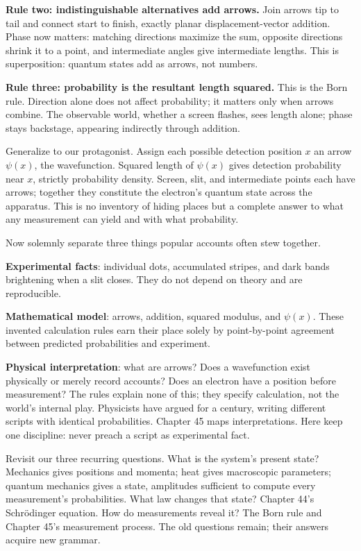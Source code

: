 \textbf{Rule two: indistinguishable alternatives add arrows.} Join arrows tip to tail and connect start to finish, exactly planar displacement-vector addition. Phase now matters: matching directions maximize the sum, opposite directions shrink it to a point, and intermediate angles give intermediate lengths. This is superposition: quantum states add as arrows, not numbers.

\textbf{Rule three: probability is the resultant length squared.} This is the Born rule. Direction alone does not affect probability; it matters only when arrows combine. The observable world, whether a screen flashes, sees length alone; phase stays backstage, appearing indirectly through addition.

Generalize to our protagonist. Assign each possible detection position \(x\) an arrow \(\psi(x)\), the wavefunction. Squared length of \(\psi(x)\) gives detection probability near \(x\), strictly probability density. Screen, slit, and intermediate points each have arrows; together they constitute the electron's quantum state across the apparatus. This is no inventory of hiding places but a complete answer to what any measurement can yield and with what probability.

Now solemnly separate three things popular accounts often stew together.

\textbf{Experimental facts}: individual dots, accumulated stripes, and dark bands brightening when a slit closes. They do not depend on theory and are reproducible.

\textbf{Mathematical model}: arrows, addition, squared modulus, and \(\psi(x)\). These invented calculation rules earn their place solely by point-by-point agreement between predicted probabilities and experiment.

\textbf{Physical interpretation}: what are arrows? Does a wavefunction exist physically or merely record accounts? Does an electron have a position before measurement? The rules explain none of this; they specify calculation, not the world's internal play. Physicists have argued for a century, writing different scripts with identical probabilities. Chapter 45 maps interpretations. Here keep one discipline: never preach a script as experimental fact.

Revisit our three recurring questions. What is the system's present state? Mechanics gives positions and momenta; heat gives macroscopic parameters; quantum mechanics gives a state, amplitudes sufficient to compute every measurement's probabilities. What law changes that state? Chapter 44's Schrödinger equation. How do measurements reveal it? The Born rule and Chapter 45's measurement process. The old questions remain; their answers acquire new grammar.


